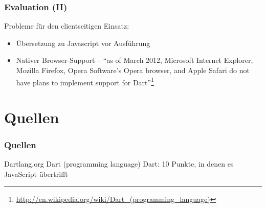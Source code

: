 \documentclass{beamer}
\begin{document}
\begin{frame}
\frametitle{Evaluation (II)}


Probleme für den clientseitigen Einsatz:
\begin{itemize}
\item Übersetzung zu Javascript vor Ausführung
\pause
\item Nativer Browser-Support --  ``as of March 2012, Microsoft Internet Explorer, Mozilla Firefox, Opera Software's Opera browser, and Apple Safari do not have plans to implement support for Dart''\footnote{\url{http://en.wikipedia.org/wiki/Dart_(programming_language)}}
\end{itemize}
\end{frame}

\section{Quellen}
\begin{frame}
\frametitle{Quellen}
\begin{thebibliography}{10}    
  \beamertemplatebookbibitems
    Dartlang.org
    Dart (programming language)
    Dart: 10 Punkte, in denen es JavaScript übertrifft
  \beamertemplatearticlebibitems
  \end{thebibliography}
\end{frame}

\end{document}
